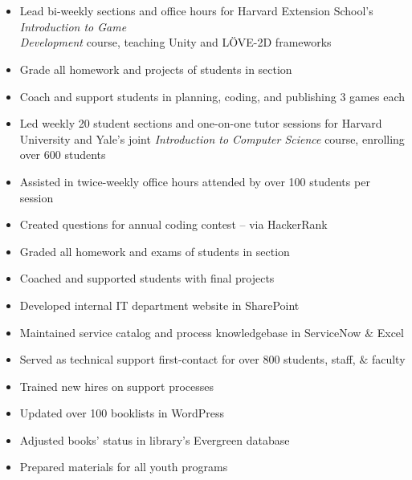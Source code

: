 \documentclass[hidelinks, 10pt]{article}
\begin{document}
\section*{}
\begin{addmargin}{.5in}

  \begin{itemize}\setlength\itemsep{-4pt}
    \item{Lead bi-weekly sections and office hours for Harvard Extension School's \emph{Introduction to Game\\ Development} course, teaching Unity and LÖVE-2D frameworks}
    \item{Grade all homework and projects of students in section}
    \item{Coach and support students in planning, coding, and publishing 3 games each}
  \end{itemize}
  \begin{itemize}\setlength\itemsep{-4pt}
    \item{Led weekly 20 student sections and one-on-one tutor sessions for Harvard University and Yale's joint \emph{Introduction to Computer Science} course, enrolling over 600 students}
    \item{Assisted in twice-weekly office hours attended by over 100 students per session}
    \item{Created questions for annual coding contest – via HackerRank}
    \item{Graded all homework and exams of students in section}
    \item{Coached and supported students with final projects}
  \end{itemize}
	\begin{itemize}\setlength\itemsep{-4pt}
    	\item{Developed internal IT department website in SharePoint}
        \item{Maintained service catalog and process knowledgebase in ServiceNow $\&$ Excel}
        \item{Served as technical support first-contact for over 800 students, staff, $\&$ faculty}
        \item{Trained new hires on support processes}
    \end{itemize}
	\begin{itemize}\setlength\itemsep{-4pt}
    	\item{Updated over 100 booklists in WordPress}
        \item{Adjusted books’ status in library’s Evergreen database}
        \item{Prepared materials for all youth programs}
    \end{itemize}
\end{addmargin}
\end{document}
